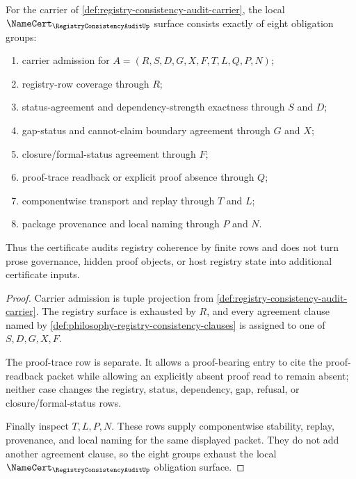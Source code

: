 \begin{theorem}
\label{thm:registry-consistency-audit-namecert-obligations}
For the carrier of \autoref{def:registry-consistency-audit-carrier}, the local $\NameCert_{\RegistryConsistencyAuditUp}$ surface consists exactly of eight obligation groups:
\begin{enumerate}
\item carrier admission for $A=(R,S,D,G,X,F,T,L,Q,P,N)$;
\item registry-row coverage through $R$;
\item status-agreement and dependency-strength exactness through $S$ and $D$;
\item gap-status and cannot-claim boundary agreement through $G$ and $X$;
\item closure/formal-status agreement through $F$;
\item proof-trace readback or explicit proof absence through $Q$;
\item componentwise transport and replay through $T$ and $L$;
\item package provenance and local naming through $P$ and $N$.
\end{enumerate}
Thus the certificate audits registry coherence by finite rows and does not turn prose governance, hidden proof objects, or host registry state into additional certificate inputs.
\end{theorem}
\begin{proof}
Carrier admission is tuple projection from \autoref{def:registry-consistency-audit-carrier}. The registry surface is exhausted by $R$, and every agreement clause named by \autoref{def:philosophy-registry-consistency-clauses} is assigned to one of $S,D,G,X,F$.

The proof-trace row is separate. It allows a proof-bearing entry to cite the proof-readback packet while allowing an explicitly absent proof read to remain absent; neither case changes the registry, status, dependency, gap, refusal, or closure/formal-status rows.

Finally inspect $T,L,P,N$. These rows supply componentwise stability, replay, provenance, and local naming for the same displayed packet. They do not add another agreement clause, so the eight groups exhaust the local $\NameCert_{\RegistryConsistencyAuditUp}$ obligation surface.
\end{proof}


